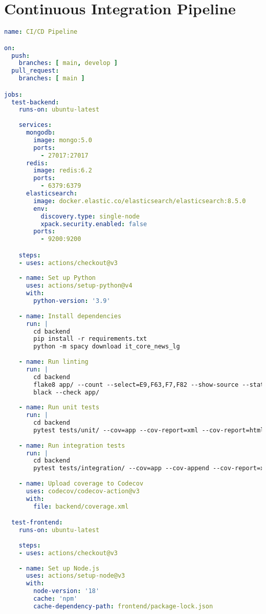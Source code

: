\documentclass[12pt,a4paper]{report}
\begin{document}
\section{Continuous Integration Pipeline}

\begin{lstlisting}[language=yaml, caption=GitHub Actions CI/CD Pipeline]
name: CI/CD Pipeline

on:
  push:
    branches: [ main, develop ]
  pull_request:
    branches: [ main ]

jobs:
  test-backend:
    runs-on: ubuntu-latest
    
    services:
      mongodb:
        image: mongo:5.0
        ports:
          - 27017:27017
      redis:
        image: redis:6.2
        ports:
          - 6379:6379
      elasticsearch:
        image: docker.elastic.co/elasticsearch/elasticsearch:8.5.0
        env:
          discovery.type: single-node
          xpack.security.enabled: false
        ports:
          - 9200:9200

    steps:
    - uses: actions/checkout@v3
    
    - name: Set up Python
      uses: actions/setup-python@v4
      with:
        python-version: '3.9'
    
    - name: Install dependencies
      run: |
        cd backend
        pip install -r requirements.txt
        python -m spacy download it_core_news_lg
    
    - name: Run linting
      run: |
        cd backend
        flake8 app/ --count --select=E9,F63,F7,F82 --show-source --statistics
        black --check app/
    
    - name: Run unit tests
      run: |
        cd backend
        pytest tests/unit/ --cov=app --cov-report=xml --cov-report=html
    
    - name: Run integration tests
      run: |
        cd backend
        pytest tests/integration/ --cov=app --cov-append --cov-report=xml
    
    - name: Upload coverage to Codecov
      uses: codecov/codecov-action@v3
      with:
        file: backend/coverage.xml

  test-frontend:
    runs-on: ubuntu-latest
    
    steps:
    - uses: actions/checkout@v3
    
    - name: Set up Node.js
      uses: actions/setup-node@v3
      with:
        node-version: '18'
        cache: 'npm'
        cache-dependency-path: frontend/package-lock.json
    

\end{lstlisting}
\end{document}
